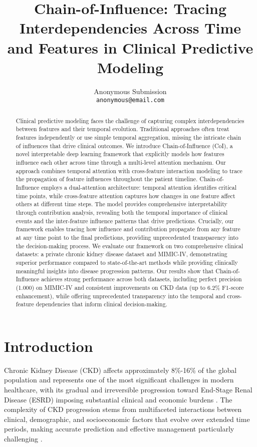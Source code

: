 \documentclass[letterpaper]{article}
\title{Chain-of-Influence: Tracing Interdependencies Across Time and Features in Clinical Predictive Modeling}
\author{
    Anonymous Submission\\
    \texttt{anonymous@email.com}
}
\begin{document}
\maketitle

\begin{abstract}
Clinical predictive modeling faces the challenge of capturing complex interdependencies between features and their temporal evolution. Traditional approaches often treat features independently or use simple temporal aggregation, missing the intricate chain of influences that drive clinical outcomes. We introduce Chain-of-Influence (CoI), a novel interpretable deep learning framework that explicitly models how features influence each other across time through a multi-level attention mechanism. Our approach combines temporal attention with cross-feature interaction modeling to trace the propagation of feature influences throughout the patient timeline. Chain-of-Influence employs a dual-attention architecture: temporal attention identifies critical time points, while cross-feature attention captures how changes in one feature affect others at different time steps. The model provides comprehensive interpretability through contribution analysis, revealing both the temporal importance of clinical events and the inter-feature influence patterns that drive predictions. Crucially, our framework enables tracing how influence and contribution propagate from any feature at any time point to the final predictions, providing unprecedented transparency into the decision-making process. We evaluate our framework on two comprehensive clinical datasets: a private chronic kidney disease dataset and MIMIC-IV, demonstrating superior performance compared to state-of-the-art methods while providing clinically meaningful insights into disease progression patterns. Our results show that Chain-of-Influence achieves strong performance across both datasets, including perfect precision (1.000) on MIMIC-IV and consistent improvements on CKD data (up to 6.2\% F1-score enhancement), while offering unprecedented transparency into the temporal and cross-feature dependencies that inform clinical decision-making.
\end{abstract}


\section{Introduction}

Chronic Kidney Disease (CKD) affects approximately 8\%-16\% of the global population and represents one of the most significant challenges in modern healthcare, with its gradual and irreversible progression toward End-Stage Renal Disease (ESRD) imposing substantial clinical and economic burdens \cite{NKF_CKD_2024, NCHS2019Mortality}. The complexity of CKD progression stems from multifaceted interactions between clinical, demographic, and socioeconomic factors that evolve over extended time periods, making accurate prediction and effective management particularly challenging \cite{lin2013progression}.
\end{document}
